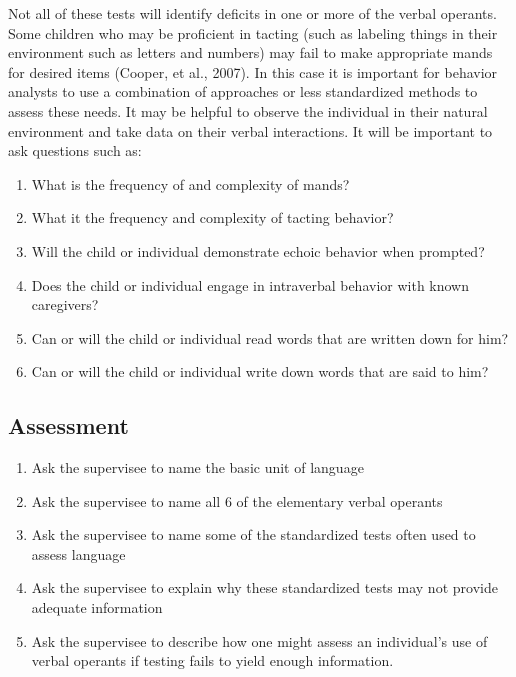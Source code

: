 Not all of these tests will identify deficits in one or more of the verbal operants. Some children who may be proficient in tacting (such as labeling things in their environment such as letters and numbers) may fail to make appropriate mands for desired items (Cooper, et al., 2007).  In this case it is important for behavior analysts to use a combination of approaches or less standardized methods to assess these needs.  It may be helpful to observe the individual in their natural environment and take data on their verbal interactions.  It will be important to ask questions such as:
\begin{enumerate}
\item What is the frequency of and complexity of mands?
\item What it the frequency and complexity of tacting behavior?
\item Will the child or individual demonstrate echoic behavior when prompted?
\item Does the child or individual engage in intraverbal behavior with known caregivers?
\item Can or will the child or individual read words that are written down for him?
\item Can or will the child or individual write down words that are said to him? 
\end{enumerate}
%
\subsection{Assessment}
\begin{enumerate}
\item Ask the supervisee to name the basic unit of language
\item Ask the supervisee to name all 6 of the elementary verbal operants
\item Ask the supervisee to name some of the standardized tests often used to assess language
\item Ask the supervisee to explain why these standardized tests may not provide adequate information
\item Ask the supervisee to describe how one might assess an individual's use of verbal operants if testing fails to yield enough information.
\end{enumerate}
%
